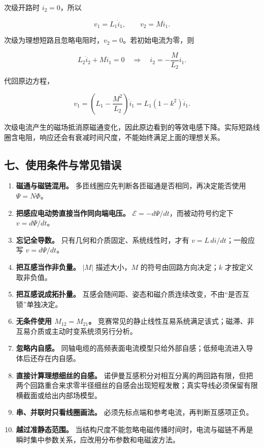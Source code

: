 次级开路时 \(i_2=0\)，所以

\[
v_1=L_1\dot i_1,
\qquad
v_2=M\dot i_1.
\]

次级为理想短路且忽略电阻时，\(v_2=0\)。若初始电流为零，则

\[
L_2\dot i_2+M\dot i_1=0
\quad\Longrightarrow\quad
i_2=-\frac M{L_2}i_1.
\]

代回原边方程，

\[
\boxed{
v_1=\left(L_1-\frac{M^2}{L_2}\right)\dot i_1
=L_1(1-k^2)\dot i_1}.
\]

次级电流产生的磁场抵消原磁通变化，因此原边看到的等效电感下降。实际短路线圈含电阻，响应还会有衰减时间尺度，不能始终满足上面的理想关系。

\subsection{七、使用条件与常见错误}\label{m5:ux4e03ux4f7fux7528ux6761ux4ef6ux4e0eux5e38ux89c1ux9519ux8bef}

\begin{enumerate}
\def\labelenumi{\arabic{enumi}.}
\tightlist
\item
  \textbf{磁通与磁链混用。}
  多匝线圈应先判断各匝磁通是否相同，再决定能否使用 \(\Psi=N\Phi\)。
\item
  \textbf{把感应电动势直接当作同向端电压。}
  \(\mathcal E=-d\Psi/dt\)，而被动符号约定下 \(v=d\Psi/dt\)。
\item
  \textbf{忘记全导数。} 只有几何和介质固定、系统线性时，才有
  \(v=L\,di/dt\)；一般应写 \(v=d\Psi/dt\)。
\item
  \textbf{把互感当作非负量。} \(|M|\) 描述大小，\(M\)
  的符号由回路方向决定；\(k\) 才按定义取非负值。
\item
  \textbf{把互感说成拓扑量。}
  互感会随间距、姿态和磁介质连续改变，不由``是否互锁''单独决定。
\item
  \textbf{无条件使用 \(M_{12}=M_{21}\)。}
  竞赛常见的静止线性互易系统满足该式；磁滞、非互易介质或主动时变系统须另行分析。
\item
  \textbf{忽略内自感。}
  同轴电缆的高频表面电流模型只给外部自感；低频电流进入导体后还存在内自感。
\item
  \textbf{直接计算理想细丝的自感。}
  诺伊曼互感积分对相互分离的两回路有限，但把两个回路重合来求零半径细丝的自感会出现短程发散；真实导线必须保留有限横截面或给出内部场模型。
\item
  \textbf{串、并联时只看线圈画法。}
  必须先标点端和参考电流，再判断互感项正负。
\item
  \textbf{越过准静态范围。}
  当结构尺度不能忽略电磁传播时间时，电流与磁链不再是瞬时集中参数关系，应改用分布参数和电磁波方法。
\end{enumerate}


